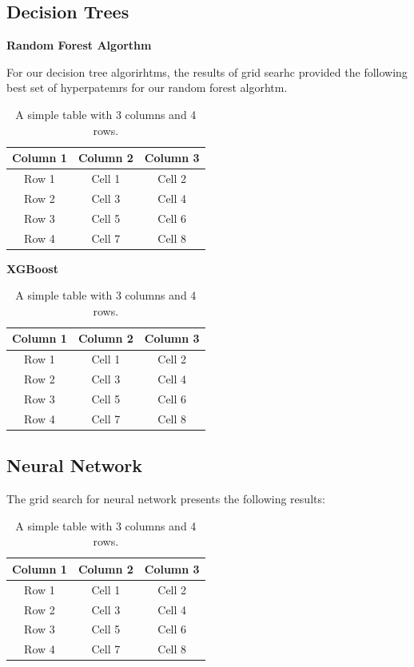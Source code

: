 \documentclass[conference]{IEEEtran}
\begin{document}
\subsection{Decision Trees}

\textbf{Random Forest Algorthm}

For our decision tree algorirhtms, the results of grid searhc provided the following best set of hyperpatemrs for our random forest algorhtm.

\begin{table}[h]
\centering
\begin{tabular}{|c|c|c|}
\hline
Column 1 & Column 2 & Column 3 \\
\hline
Row 1 & Cell 1 & Cell 2 \\
Row 2 & Cell 3 & Cell 4 \\
Row 3 & Cell 5 & Cell 6 \\
Row 4 & Cell 7 & Cell 8 \\
\hline
\end{tabular}
\caption{A simple table with 3 columns and 4 rows.}
\label{tab:mytable}
\end{table}

\textbf{XGBoost} 

\begin{table}[h]
\centering
\begin{tabular}{|c|c|c|}
\hline
Column 1 & Column 2 & Column 3 \\
\hline
Row 1 & Cell 1 & Cell 2 \\
Row 2 & Cell 3 & Cell 4 \\
Row 3 & Cell 5 & Cell 6 \\
Row 4 & Cell 7 & Cell 8 \\
\hline
\end{tabular}
\caption{A simple table with 3 columns and 4 rows.}
\label{tab:mytable}
\end{table}

\subsection{Neural Network}

The grid search for neural network presents the following results: 

\begin{table}[h]
\centering
\begin{tabular}{|c|c|c|}
\hline
Column 1 & Column 2 & Column 3 \\
\hline
Row 1 & Cell 1 & Cell 2 \\
Row 2 & Cell 3 & Cell 4 \\
Row 3 & Cell 5 & Cell 6 \\
Row 4 & Cell 7 & Cell 8 \\
\hline
\end{tabular}
\caption{A simple table with 3 columns and 4 rows.}
\label{tab:mytable}
\end{table}
\end{document}
